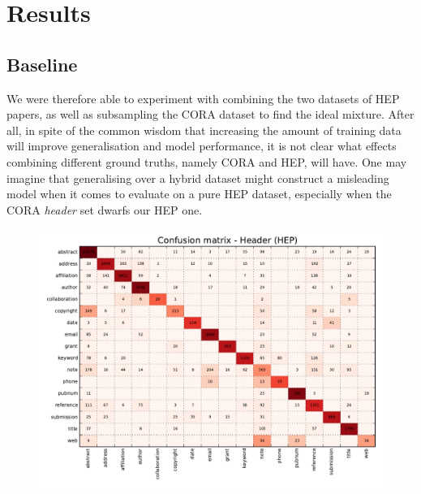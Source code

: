 \section{Results}

\subsection{Baseline}

 We were therefore able to experiment with combining the two datasets of HEP papers, as well as subsampling the CORA dataset to find the ideal mixture. After all, in spite of the common wisdom that increasing the amount of training data will improve generalisation and model performance, it is not clear what effects combining different ground truths, namely CORA and HEP, will have. One may imagine that generalising over a hybrid dataset might construct a misleading model when it comes to evaluate on a pure HEP dataset, especially when the CORA \emph{header} set dwarfs our HEP one.

\begin{figure}[h]
\center
\includegraphics[width=5.5in]{Figures/header_baseline_confusion.pdf}
\caption{}
\label{fig:header_baseline_confusion}
\end{figure}

